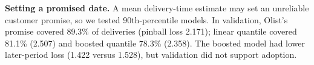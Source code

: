 \documentclass[12pt,a4paper]{article}
\begin{document}
\textbf{Setting a promised date.} A mean delivery-time estimate may set an unreliable customer promise, so we tested 90th-percentile models. In validation, Olist's promise covered 89.3\% of deliveries (pinball loss 2.171); linear quantile covered 81.1\% (2.507) and boosted quantile 78.3\% (2.358). The boosted model had lower later-period loss (1.422 versus 1.528), but validation did not support adoption.
\normalsize
\end{document}
